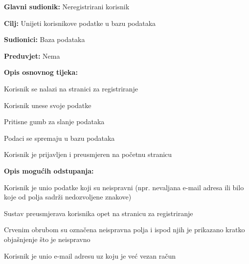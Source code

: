 					\noindent {}
					\begin{packed_item}
						
						\item \textbf{Glavni sudionik: }Neregistrirani korisnik
						\item  \textbf{Cilj:} Unijeti korisnikove podatke u bazu podataka
						\item  \textbf{Sudionici:} Baza podataka
						\item  \textbf{Preduvjet:} Nema
						\item  \textbf{Opis osnovnog tijeka:}
						
						\item[] \begin{packed_enum}
							\item Korisnik se nalazi na stranici za registriranje
							\item Korisnik unese svoje podatke
							\item Pritisne gumb za slanje podataka 
							\item Podaci se spremaju u bazu podataka
							\item Korisnik je prijavljen i preusmjeren na početnu stranicu
						\end{packed_enum}
					
						\item  \textbf{Opis mogućih odstupanja:}
						
						\item[] \begin{packed_item}
							
							\item[4.a] Korisnik je unio podatke koji su neispravni (npr. nevaljana e-mail adresa ili bilo koje od polja sadrži nedozvoljene znakove)
							\item[] \begin{packed_enum}
								
								\item Sustav preusmjerava korisnika opet na stranicu za registriranje
								\item Crvenim obrubom su označena neispravna polja i ispod njih je prikazano kratko objašnjenje što je neispravno
								
							\end{packed_enum}
						
							\item[4.b] Korisnik je unio e-mail adresu uz koju je već vezan račun
							\item[] \begin{packed_enum}
								

\end{packed_enum}
\end{packed_item}
\end{packed_item}
